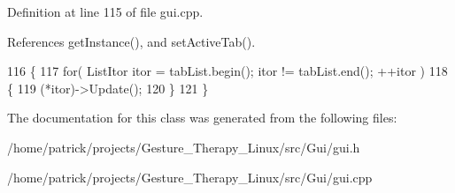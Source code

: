 Definition at line 115 of file gui.\+cpp.



References get\+Instance(), and set\+Active\+Tab().


\begin{DoxyCode}
116 \{
117     \textcolor{keywordflow}{for}( ListItor itor = tabList.begin(); itor != tabList.end(); ++itor )
118     \{
119         (*itor)->Update();
120     \}
121 \}
\end{DoxyCode}


The documentation for this class was generated from the following files\+:\begin{DoxyCompactItemize}
\item 
/home/patrick/projects/\+Gesture\+\_\+\+Therapy\+\_\+\+Linux/src/\+Gui/gui.\+h\item 
/home/patrick/projects/\+Gesture\+\_\+\+Therapy\+\_\+\+Linux/src/\+Gui/gui.\+cpp\end{DoxyCompactItemize}
